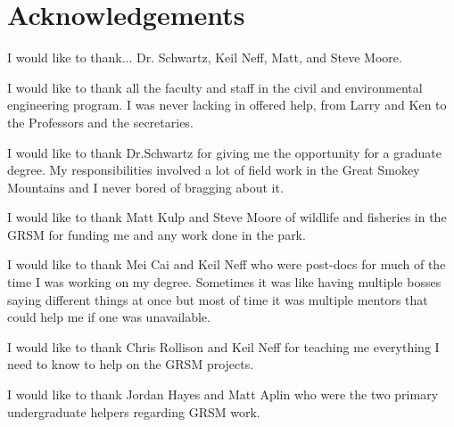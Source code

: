 \chapter*{Acknowledgements}
I would like to thank...
	Dr. Schwartz, Keil Neff, Matt, and Steve Moore.
	
	I would like to thank all the faculty and staff in the civil and environmental engineering program.  I was never lacking in offered help, from Larry and Ken to the Professors and the secretaries.
	
	I would like to thank Dr.Schwartz for giving me the opportunity for a graduate degree.  My responsibilities involved a lot of field work in the Great Smokey Mountains and I never bored of bragging about it.
	
	I would like to thank Matt Kulp and Steve Moore of wildlife and fisheries in the GRSM for funding me and any work done in the park.
	
	I would like to thank Mei Cai and Keil Neff who were post-docs for much of the time I was working on my degree.  Sometimes it was like having multiple bosses saying different things at once but most of time it was multiple mentors that could help me if one was unavailable.
	
	I would like to thank Chris Rollison and Keil Neff for teaching me everything I need to know to help on the GRSM projects.
	
	I would like to thank Jordan Hayes and Matt Aplin who were the two primary undergraduate helpers regarding GRSM work.